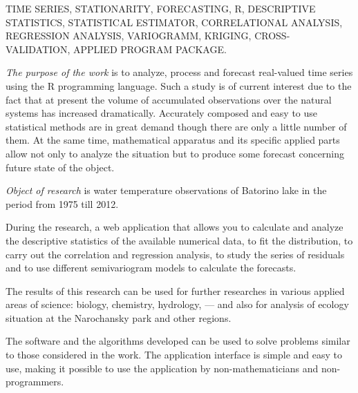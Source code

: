 \documentclass[a4paper,14pt]{extreport}
\begin{document}
TIME SERIES, STATIONARITY, FORECASTING, R, DESCRIPTIVE STATISTICS, STATISTICAL ESTIMATOR, CORRELATIONAL ANALYSIS, REGRESSION ANALYSIS, VARIOGRAMM, KRIGING, CROSS-VALIDATION, APPLIED PROGRAM PACKAGE\@.

\textit{The purpose of the work} is to analyze, process and forecast real-valued time series using the R programming language. Such a study is of current interest due to the fact that at present the volume of accumulated observations over the natural systems has increased dramatically. Accurately composed and easy to use statistical methods are in great demand though there are only a little number of them. At the same time, mathematical apparatus and its specific applied parts allow not only to analyze the situation but to produce some forecast concerning future state of the object.

\textit{Object of research} is water temperature observations of Batorino lake in the period from 1975 till 2012.

During the research, a web application that allows you to calculate and analyze the descriptive statistics of the available numerical data, to fit the distribution, to carry out the correlation and regression analysis, to study the series of residuals and to use different semivariogram models to calculate the forecasts.

The results of this research can be used for further researches in various applied areas of science: biology, chemistry, hydrology, --- and also for analysis of ecology situation at the Narochansky park and other regions.

The software and the algorithms developed can be used to solve problems similar to those considered in the work. The application interface is simple and easy to use, making it possible to use the application by non-mathematicians and non-programmers.
\end{document}
